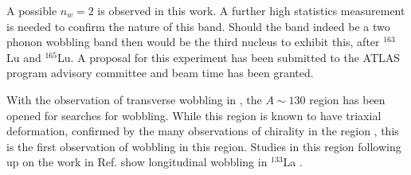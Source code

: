 A possible $n_w=2$ is observed in this work. A further high statistics measurement is needed to confirm the nature of this band. Should the band indeed be a two phonon wobbling band then \pr{} would be the third nucleus to exhibit this, after $^{163}$Lu and $^{165}$Lu. A proposal for this experiment has been submitted to the ATLAS program advisory committee and beam time has been granted.

With the observation of transverse wobbling in \pr{}, the $A\sim{}130$ region has been opened for searches for wobbling. While this region is known to have triaxial deformation, confirmed by the many observations of chirality in the region \cite{chiralityIn134Pr,chiralityA130Region,chiralityUpperA130Region,chiralityA130Region2,chirality136Pm,chiralityMore135Nd,chiralityIn135Nd,chiralityMulti133Cs}, this is the first observation of wobbling in this region. Studies in this region following up on the work in Ref. \cite{mattaTransversePRL} show longitudinal wobbling in $^{133}$La \cite{palitLongWobbling}.

